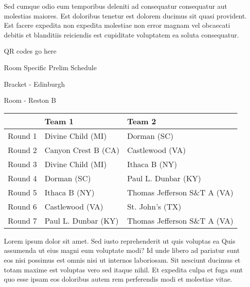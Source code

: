 \documentclass{article}%
\begin{document}
\newline%
Sed cumque odio eum temporibus deleniti ad consequatur consequatur aut molestias maiores. Est doloribus tenetur est dolorem ducimus sit quasi provident. Est facere expedita non expedita molestiae non error magnam vel obcaecati debitis et blanditiis reiciendis est cupiditate voluptatem ea soluta consequatur.%
\vspace*{140pt}%
\begin{center}%
\begin{Huge}%
QR codes go here%
\end{Huge}%
\end{center}%
\newpage%
\begin{center}%
\begin{Huge}%
Room Specific Prelim Schedule%
\end{Huge}%
\vspace*{8pt}%
\linebreak%
\begin{Large}%
Bracket {-} Edinburgh%
\end{Large}%
\vspace*{8pt}%
\linebreak%
\vspace*{8pt}%
\begin{Large}%
Room {-} Reston B%
\end{Large}%
\end{center}%
%
\begin{tabularx}{\textwidth}{|c|Y|Y|}%
\hline%
&Team 1&Team 2\\%
\hline%
Round 1&Divine Child (MI)&Dorman (SC)\\%
Round 2&Canyon Crest B (CA)&Castlewood (VA)\\%
Round 3&Divine Child (MI)&Ithaca B (NY)\\%
Round 4&Dorman (SC)&Paul L. Dunbar (KY)\\%
Round 5&Ithaca B (NY)&Thomas Jefferson S\&T A (VA)\\%
Round 6&Castlewood (VA)&St. John's (TX)\\%
Round 7&Paul L. Dunbar (KY)&Thomas Jefferson S\&T A (VA)\\%
\hline%
\end{tabularx}%
\vspace*{8pt}%
\newline%
Lorem ipsum dolor sit amet. Sed iusto reprehenderit ut quis voluptas ea Quis assumenda ut eius magni eum voluptate modi? Id unde libero ad pariatur sunt eos nisi possimus est omnis nisi ut internos laboriosam. Sit nesciunt ducimus et totam maxime est voluptas vero sed itaque nihil. Et expedita culpa et fuga sunt quo esse ipsam eos doloribus autem rem perferendis modi et molestiae vitae.\newline%
\end{document}
